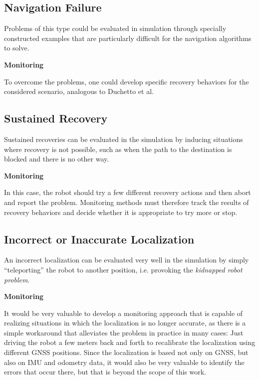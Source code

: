 \documentclass[english, master, utf8]{base/thesis_KBS}
\begin{document}
\subsection{Navigation Failure}
\label{sec:sim_and_mon_navigation_failures}

Problems of this type could be evaluated in simulation through specially constructed examples that are particularly difficult for the navigation algorithms to solve.\newline

\noindent
\textbf{Monitoring}\newline

\noindent
To overcome the problems, one could develop specific recovery behaviors for the considered scenario, analogous to Duchetto et al.

\subsection{Sustained Recovery}
\label{sec:sim_and_mon_sustained_recovery}

Sustained recoveries can be evaluated in the simulation by inducing situations where recovery is not possible, such as when the path to the destination is
blocked and there is no other way.\newline

\noindent
\textbf{Monitoring}\newline

\noindent
In this case, the robot should try a few different recovery actions and then abort and report the problem.
Monitoring methods must therefore track the results of recovery behaviors and decide whether it is appropriate to try more or stop.

\subsection{Incorrect or Inaccurate Localization}
\label{sec:sim_and_mon_incorrect_localization}

An incorrect localization can be evaluated very well in the simulation by simply ``teleporting'' the robot to another position, i.e. provoking the
\textit{kidnapped robot problem}.\newline

\noindent
\textbf{Monitoring}\newline

\noindent
It would be very valuable to develop a monitoring approach that is capable of realizing situations in which the localization is no longer accurate, as there is a 
simple workaround that alleviates the problem in practice in many cases: Just driving the robot a few meters back and forth to recalibrate the localization
using different GNSS positions. Since the localization is based not only on GNSS, but also on IMU and odometry data, it would also be very valuable to identify
the errors that occur there, but that is beyond the scope of this work.
\end{document}
